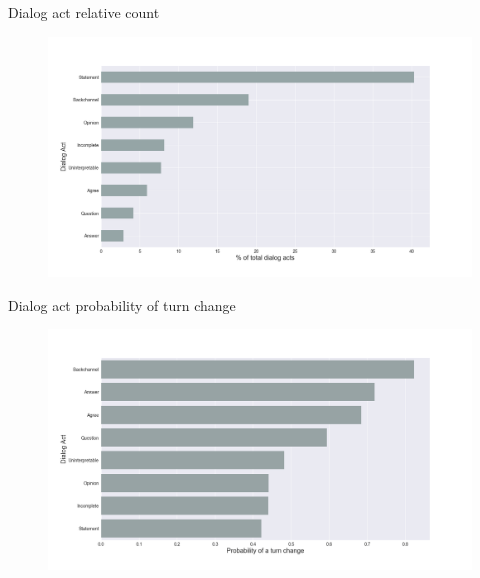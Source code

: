 \begin{frame}{Dialog act relative count}
\begin{figure}[ht!]
\centering
\includegraphics[width=36em]{../scikitlearn/figures/f1.png}\vspace{-1em}
\end{figure}
\end{frame}

\begin{frame}{Dialog act probability of turn change}
\begin{figure}[ht!]
\centering
\includegraphics[width=36em]{../scikitlearn/figures/f2.png}\vspace{-1em}
\end{figure}
\end{frame}


